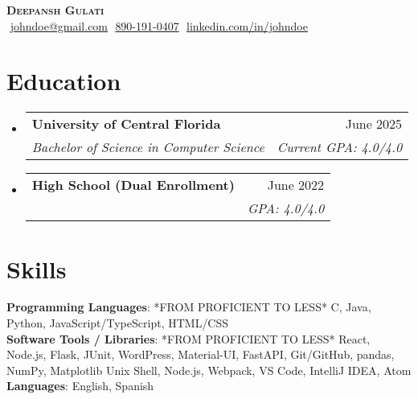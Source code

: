 \documentclass[letterpaper,11pt]{article}
\makeatletter
\newcommand{\resumeSubheading}[4]{
  \vspace{-2pt}\item
    \begin{tabular*}{0.97\textwidth}[t]{l@{\extracolsep{\fill}}r}
      \textbf{#1} & #2 \\
      \textit{\small#3} & \textit{\small #4} \\
    \end{tabular*}\vspace{-7pt}
}
\newcommand{\resumeSubHeadingListStart}{\begin{itemize}[leftmargin=0.15in, label={}]}
\newcommand{\resumeSubHeadingListEnd}{\end{itemize}}
\makeatother
\begin{document}
\begin{flushright}
  \vspace{-4pt}
\end{flushright}

\vspace{-7pt}

\begin{center}
    \textbf{\Huge \scshape Deepansh Gulati} \\ \vspace{8pt}
    \small 
    \faEnvelope$  $
    \href{mailto:johndoe@gmail.com}
    {\underline{johndoe@gmail.com}}
    \faPhone$  $
    \underline{890-191-0407}
    \faLinkedin$  $
    \href{https://linkedin.com/in/johndoe}{\underline{linkedin.com/in/johndoe}} $  $
\end{center}

\section{Education}
  \resumeSubHeadingListStart
  
    \resumeSubheading
      {University of Central Florida}{June 2025}
      {Bachelor of Science in Computer Science}{Current GPA: 4.0/4.0}
      
    \resumeSubheading
      {High School \footnotesize{(Dual Enrollment)}}{June 2022}
      {}{GPA: 4.0/4.0}

  \resumeSubHeadingListEnd

\section{Skills}
 \begin{itemize}[leftmargin=0.15in, label={}]
    \small{\item{
    
     \textbf{Programming Languages}{: *FROM PROFICIENT TO LESS* C, Java, Python, JavaScript/TypeScript, HTML/CSS} \\
     
     \textbf{Software Tools / Libraries}{: *FROM PROFICIENT TO LESS* React, Node.js, Flask, JUnit, WordPress, Material-UI, FastAPI, Git/GitHub, pandas, NumPy, Matplotlib Unix Shell, Node.js, Webpack, VS Code, IntelliJ IDEA, Atom} \\

     \textbf{Languages}{: English, Spanish} \\
     
    }}
 \end{itemize}
\end{document}
